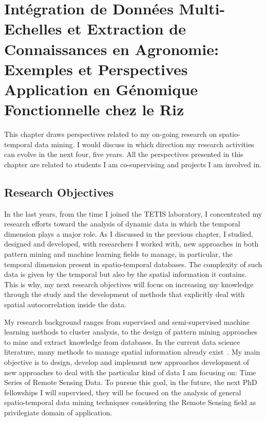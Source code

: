 \chapter{Intégration de Données Multi-Echelles et Extraction de Connaissances en Agronomie: Exemples et Perspectives \\ \vspace{0.3cm} \small{Application en Génomique Fonctionnelle chez le Riz}} %

\label{Perspectives} %

This chapter draws perspectives related to my on-going research on spatio-temporal data mining.
I would discuss in which direction my research activities can evolve in the next four, five years. All the perspectives presented in this chapter are related to students I am co-supervising and projects I am involved in. %


\section{Research Objectives}
In the last years, from the time I joined the TETIS laboratory, I concentrated my research efforts toward the analysis of dynamic data in which the temporal dimension plays a major role. As I discussed in the previous chapter, I studied, designed and developed, with researchers I worked with, new approaches in both pattern mining and machine learning fields to manage, in particular, the temporal dimension present in spatio-temporal databases. The complexity of such data is given by the temporal but also by the spatial information it contains. This is why, my next research objectives will focus on increasing my knowledge through the study and the development of methods that explicitly deal with spatial autocorrelation inside the data.

My research background ranges from supervised and semi-supervised machine learning methods to cluster analysis, to the design of pattern mining approaches to mine and extract knowledge from databases. 
In the current data science literature, many methods to manage spatial information already exist~\cite{BogornyS10}. 
My main objective is to design, develop and implement new approaches development of new approaches to deal with the particular kind of data I am focusing on: Time Series of Remote Sensing Data.
To pursue this goal, in the future, the next PhD fellowships I will supervised, they will be focused on the analysis of general spatio-temporal data mining techniques considering the Remote Sensing field as privilegiate domain of application.

